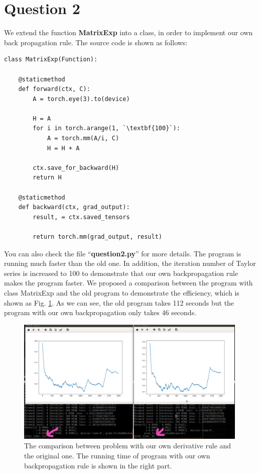 \documentclass[UTF8]{article}
\newcommand{\reffig}[1]{Fig. \ref{#1}}
\begin{document}
\section*{Question 2}
\label{sec_q2}
We extend the function \textbf{MatrixExp} into a class, in order to implement our own back propagation rule.
The source code is shown as follows: 
\begin{lstlisting}
class MatrixExp(Function):

    @staticmethod
    def forward(ctx, C):
        A = torch.eye(3).to(device)

        H = A
        for i in torch.arange(1, `\textbf{100}`):
            A = torch.mm(A/i, C)
            H = H + A

        ctx.save_for_backward(H)
        return H

    @staticmethod
    def backward(ctx, grad_output):
        result, = ctx.saved_tensors

        return torch.mm(grad_output, result)
\end{lstlisting}
You can also check the file ``\textbf{question2.py}'' for more details.
The program is running much faster than the old one.
In addition, the iteration number of Taylor series is increased to 100 to demonstrate that our own backpropagation rule makes the program faster.
We proposed a comparison between the program with class MatrixExp and the old program to demonstrate the efficiency,
which is shown as \reffig{fig2}. As we can see, the old program takes 112 seconds but the program with our own backpropagation only takes 46 seconds.

\begin{figure}[htbp]	%
\centering
\includegraphics[width=0.99\textwidth]{figure/matrixexp.png}
    \caption{The comparison between problem with our own derivative rule and the original one. The running time of program with our own backpropagation rule is shown in the right part.}
\label{fig2}
\end{figure} 
\   \\\\\\\\\\
\end{document}
